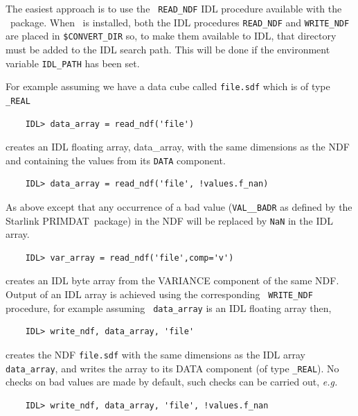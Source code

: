 \documentclass[twoside,11pt]{article}
\newcommand{\xref}[3]{#1}
\begin{document}
\begin{\htmlonly}
The easiest approach is to use the \xref{{\tt
READ\_NDF}}{sun55}{READ_NDF} IDL procedure available with the
\CONVERT\ package.  When \CONVERT\ is installed, both the
IDL procedures {\tt READ\_NDF} and {\tt WRITE\_NDF} are placed in
{\tt \$CONVERT\_DIR} so, to make them available to IDL, that directory
must be added to the IDL search path.  This will be done if the
environment variable {\tt IDL\_PATH} has been set.

For example assuming we have a data cube called {\tt file.sdf} which is
of type {\tt \_REAL}

\small\begin{verbatim}
    IDL> data_array = read_ndf('file') 
\end{verbatim}\normalsize

creates an IDL floating array, data\_array, with the same dimensions
as the NDF and containing the values from its {\tt DATA} component.

\small\begin{verbatim}
    IDL> data_array = read_ndf('file', !values.f_nan)
\end{verbatim}\normalsize

As above except that any occurrence of a bad value ({\tt VAL\_\_BADR}
as defined by the Starlink \xref{{\footnotesize
PRIMDAT}\normalsize}{sun39}{}\normalsize\ package) in the NDF will be replaced by
{\tt NaN} in the IDL array.

\small\begin{verbatim}
    IDL> var_array = read_ndf('file',comp='v')
\end{verbatim}\normalsize

creates an IDL byte array from the VARIANCE component of the same NDF.
Output of an IDL array is achieved using the corresponding \xref{{\tt
WRITE\_NDF}}{sun55}{WRITE_NDF} procedure, for example assuming {\tt
data\_array} is an IDL floating array then,

\small\begin{verbatim}
    IDL> write_ndf, data_array, 'file'
\end{verbatim}\normalsize

creates the NDF {\tt file.sdf} with the same dimensions as the IDL
array {\tt data\_array}, and writes the array to its DATA component
(of type {\tt \_REAL}).  No checks on bad values are made by default,
such checks can be carried out, \emph{e.g.}\

\small\begin{verbatim}
    IDL> write_ndf, data_array, 'file', !values.f_nan
\end{verbatim}\normalsize  


\end{\htmlonly}
\end{document}

